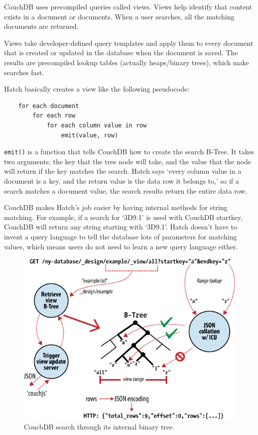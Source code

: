 CouchDB uses precompiled queries called views. Views help identify that content
exists in a document or documents. When a user searches, all the matching documents
are returned.

Views take developer-defined
query templates and apply them to every document that is created or updated in the 
database when the document is saved. The results are precompiled lookup tables 
(actually heaps/binary trees), which make searches fast. 

Hatch basically creates a view like the following pseudocode:
\singlespacing
\begin{lstlisting}
	for each document
		for each row
			for each column value in row
				emit(value, row)
\end{lstlisting}
\doublespacing

\texttt{emit()} is a function that tells CouchDB how to create the search B-Tree. It 
takes two arguments; the key that the tree node will take, and the value that the 
node will return if the key matches the search. Hatch says `every column value in a 
document is a key, and the return value is the data row it belongs to,' so if a search
matches a document value, the search results return the entire data row.

CouchDB makes Hatch's job easier by having internal methods for string matching. For
example, if a search for `3D9.1' is used with CouchDB startkey, CouchDB will return
any string starting with `3D9.1'. Hatch doesn't have to invent a query language to 
tell the database lots of parameters for matching values, which means users do not
need to learn a new query language either.

\begin{figure}[h]
	\begin{center}
	\includegraphics[width=120mm]{images/couchdb_b_tree}
	\caption{CoucbDB search through its internal binary tree.} 
	\label{couchdb_b_tree}
	\end{center}
\end{figure}

